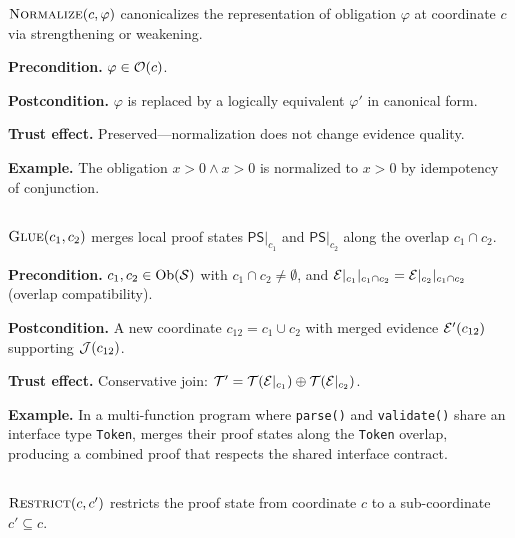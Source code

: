 \documentclass[11pt]{article}
\newcommand{\PS}{\mathsf{PS}}
\begin{document}
\begin{definition}[\NORMALIZE]
$\textsc{Normalize}(c, \varphi)$ canonicalizes the representation of
obligation $\varphi$ at coordinate $c$ via strengthening or weakening.
\end{definition}

\noindent\textbf{Precondition.}
$\varphi \in \mathcal{O}(c)$.

\noindent\textbf{Postcondition.}
$\varphi$ is replaced by a logically equivalent $\varphi'$ in
canonical form.

\noindent\textbf{Trust effect.}
Preserved---normalization does not change evidence quality.

\noindent\textbf{Example.}
The obligation $x > 0 \wedge x > 0$ is normalized to $x > 0$
by idempotency of conjunction.

\subsection{\GLUE}\label{sec:move-glue}

\begin{definition}[\GLUE]
$\textsc{Glue}(c_1, c_2)$ merges local proof states $\PS|_{c_1}$ and
$\PS|_{c_2}$ along the overlap $c_1 \cap c_2$.
\end{definition}

\noindent\textbf{Precondition.}
$c_1, c_2 \in \mathrm{Ob}(\mathcal{S})$ with $c_1 \cap c_2 \neq \emptyset$,
and $\mathcal{E}|_{c_1}|_{c_1 \cap c_2} = \mathcal{E}|_{c_2}|_{c_1 \cap c_2}$
(overlap compatibility).

\noindent\textbf{Postcondition.}
A new coordinate $c_{12} = c_1 \cup c_2$ with merged evidence
$\mathcal{E}'(c_{12})$ supporting $\mathcal{J}(c_{12})$.

\noindent\textbf{Trust effect.}
Conservative join: $\mathcal{T}' = \mathcal{T}(\mathcal{E}|_{c_1}) \oplus \mathcal{T}(\mathcal{E}|_{c_2})$.

\noindent\textbf{Example.}
In a multi-function program where \texttt{parse()} and
\texttt{validate()} share an interface type \texttt{Token},
\GLUE{} merges their proof states along the \texttt{Token} overlap,
producing a combined proof that respects the shared interface contract.

\subsection{\RESTRICT}\label{sec:move-restrict}

\begin{definition}[\RESTRICT]
$\textsc{Restrict}(c, c')$ restricts the proof state from coordinate $c$
to a sub-coordinate $c' \subseteq c$.
\end{definition}
\end{document}
